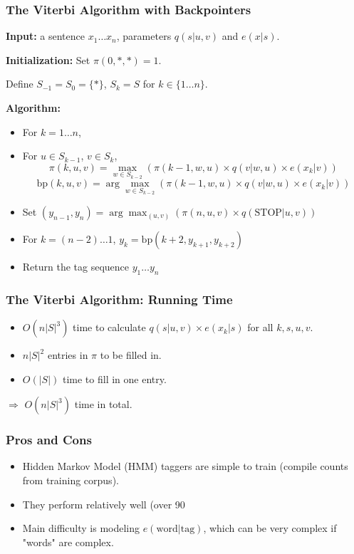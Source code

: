 \documentclass[handout]{beamer}
\begin{document}
\begin{frame}
  \frametitle{The Viterbi Algorithm with Backpointers}
  \textbf{Input:} a sentence $x_1 \ldots x_n$, parameters $q(s|u, v)$ and $e(x|s)$.

  \textbf{Initialization:} Set $\pi(0, *, *) = 1$.

  Define $S_{-1} = S_0 = \{*\}$, $S_k = S$ for $k \in \{1 \ldots n\}$.

  \textbf{Algorithm:}
  \begin{itemize}
    \item For $k = 1 \ldots n$,
    \item For $u \in S_{k-1}$, $v \in S_k$,
    \[
      \pi(k, u, v) = \max_{w \in S_{k-2}} (\pi(k - 1, w, u) \times q(v|w, u) \times e(x_k|v))
    \]
    \[
      \text{bp}(k, u, v) = \arg \max_{w \in S_{k-2}} (\pi(k - 1, w, u) \times q(v|w, u) \times e(x_k|v))
    \]
    \item Set $(y_{n-1}, y_n) = \arg \max_{(u,v)} (\pi(n, u, v) \times q(\text{STOP}|u, v))$
    \item For $k = (n - 2) \ldots 1$, $y_k = \text{bp}(k + 2, y_{k+1}, y_{k+2})$
    \item Return the tag sequence $y_1 \ldots y_n$
  \end{itemize}
\end{frame}

\begin{frame}
  \frametitle{The Viterbi Algorithm: Running Time}
  \begin{itemize}
    \item $O(n|S|^3)$ time to calculate $q(s|u, v) \times e(x_k|s)$ for all $k, s, u, v$.
    \item $n|S|^2$ entries in $\pi$ to be filled in.
    \item $O(|S|)$ time to fill in one entry.
  \end{itemize}
  $\Rightarrow$ $O(n|S|^3)$ time in total.
\end{frame}

\begin{frame}
  \frametitle{Pros and Cons}
  \begin{itemize}
    \item Hidden Markov Model (HMM) taggers are simple to train (compile counts from training corpus).
    \item They perform relatively well (over 90%
    \item Main difficulty is modeling $e(\text{word} | \text{tag})$, which can be very complex if "words" are complex.
  \end{itemize}
\end{frame}
\end{document}

